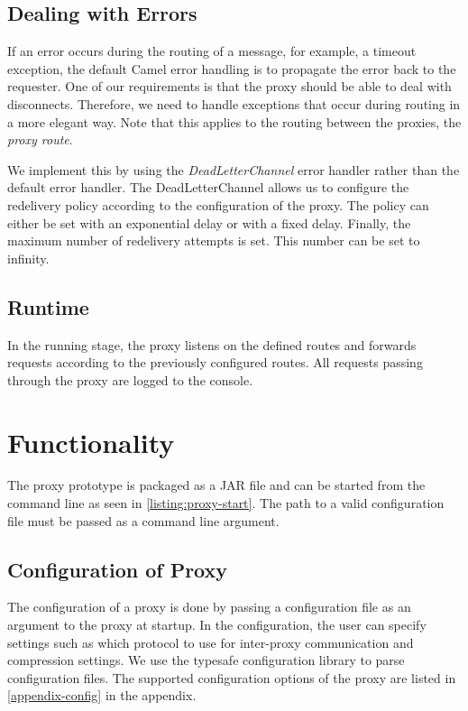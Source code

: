 \subsection{Dealing with Errors}

If an error occurs during the routing of a message, for example, a timeout
exception, the default Camel error handling is to propagate the error back to
the requester. One of our requirements is that the proxy should be able to deal
with disconnects. Therefore, we need to handle exceptions that occur during
routing in a more elegant way. Note that this applies to the routing between the
proxies, the \textit{proxy route}.

We implement this by using the \textit{DeadLetterChannel} error handler rather
than the default error handler. The DeadLetterChannel allows us to configure the
redelivery policy according to the configuration of the proxy. The policy can
either be set with an exponential delay or with a fixed delay. Finally, the
maximum number of redelivery attempts is set. This number can be set to
infinity.

\subsection{Runtime}

In the running stage, the proxy listens on the defined routes and forwards
requests according to the previously configured routes. All requests passing
through the proxy are logged to the console.


\section{Functionality}

The proxy prototype is packaged as a JAR file and can be started from the command
line as seen in \cref{listing:proxy-start}. The path to a valid configuration
file must be passed as a command line argument.



\subsection{Configuration of Proxy}
\label{section:proxy-config}

The configuration of a proxy is done by passing a configuration file as an
argument to the proxy at startup. In the configuration, the user can specify
settings such as which protocol to use for inter-proxy communication and
compression settings. We use the typesafe\cite{typesafe-homepage} configuration
library to parse configuration files. The supported configuration options of the
proxy are listed in \cref{appendix-config} in the appendix.

